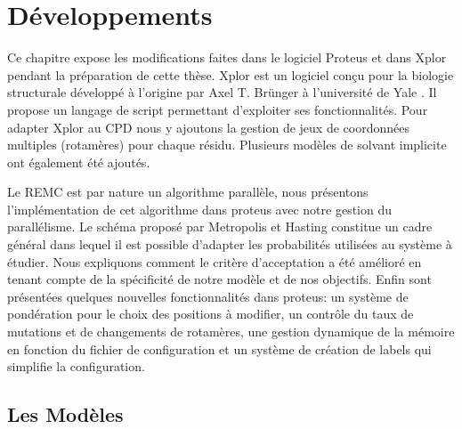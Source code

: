 \chapter{Développements}
\label{chap:developpements}

Ce chapitre expose les modifications faites dans le logiciel Proteus et dans Xplor pendant la préparation de cette thèse. Xplor est un logiciel conçu pour la biologie structurale développé à l'origine par Axel T. Brünger à l'université de Yale \cite{Xplor}. Il propose un langage de script permettant d'exploiter ses fonctionnalités. Pour adapter Xplor au CPD nous y ajoutons la gestion de jeux de coordonnées multiples (rotamères) pour chaque résidu. Plusieurs modèles de solvant implicite ont également été ajoutés.

Le REMC est par nature un algorithme parallèle, nous présentons l'implémentation de cet algorithme dans proteus avec notre gestion du parallélisme. Le schéma proposé par Metropolis et Hasting constitue un cadre général dans lequel il est possible d'adapter les probabilités utilisées au système à étudier. Nous expliquons comment le critère d'acceptation a été amélioré en tenant compte de la spécificité de notre modèle et de nos objectifs. Enfin sont présentées quelques nouvelles fonctionnalités dans proteus: un système de pondération pour le choix des positions à modifier, un contrôle du taux de mutations et de changements de rotamères, une gestion dynamique de la mémoire en fonction du fichier de configuration et un système de création de labels qui simplifie la configuration.  


\section{Les Modèles }

